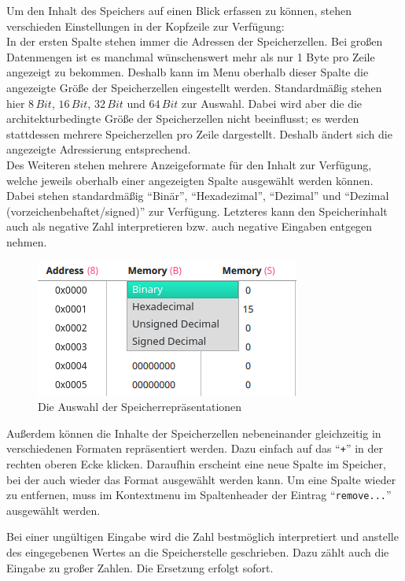 Um den Inhalt des Speichers auf einen Blick erfassen zu können, stehen verschieden Einstellungen in der Kopfzeile zur Verfügung:\\
In der ersten Spalte stehen immer die Adressen der Speicherzellen.
Bei großen Datenmengen ist es manchmal wünschenswert mehr als nur 1 Byte pro Zeile angezeigt zu bekommen.
Deshalb kann im Menu oberhalb dieser Spalte die angezeigte Größe der Speicherzellen eingestellt werden.
Standardmäßig stehen hier $8\, Bit$, $16\, Bit$, $32\, Bit$ und $64\, Bit$ zur Auswahl.
Dabei wird aber die die architekturbedingte Größe der Speicherzellen nicht beeinflusst; es werden stattdessen mehrere Speicherzellen pro Zeile dargestellt.
Deshalb ändert sich die angezeigte Adressierung entsprechend.\\
Des Weiteren stehen mehrere Anzeigeformate für den Inhalt zur Verfügung, welche jeweils oberhalb einer angezeigten Spalte ausgewählt werden können.
Dabei stehen standardmäßig ``Binär'', ``Hexadezimal'', ``Dezimal'' und ``Dezimal (vorzeichenbehaftet/signed)'' zur Verfügung.
Letzteres kann den Speicherinhalt auch als negative Zahl interpretieren bzw. auch negative Eingaben entgegen nehmen. \\

\begin{figure}[ht]
	\centering
  \includegraphics[scale=1]{Images/Memory_Representation}
	\caption{Die Auswahl der Speicherrepräsentationen}
	\label{Memory_Respresentations}
\end{figure}

Außerdem können die Inhalte der Speicherzellen nebeneinander gleichzeitig in verschiedenen Formaten repräsentiert werden.
Dazu einfach auf das ``\texttt{+}'' in der rechten oberen Ecke klicken. Daraufhin erscheint eine neue Spalte im Speicher,
bei der auch wieder das Format ausgewählt werden kann. Um eine Spalte wieder zu entfernen, muss im Kontextmenu im Spaltenheader der
Eintrag ``\texttt{remove...}'' ausgewählt werden.

\begin{warningblock}
Bei einer ungültigen Eingabe wird die Zahl bestmöglich interpretiert und anstelle des
eingegebenen Wertes an die Speicherstelle geschrieben. Dazu zählt auch die Eingabe zu großer Zahlen.
Die Ersetzung erfolgt sofort.
\end{warningblock}


